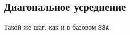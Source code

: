 \documentclass[12pt, specialist, subf
]{disser}
\theoremstyle{definition}
\newcommand{\SSA}{\texttt{SSA}}
\newtheorem{comment}{Замечание} %
\begin{document}
\subsection*{Диагональное усреднение}
Такой же шаг, как и в базовом $\SSA$.

\end{document}
